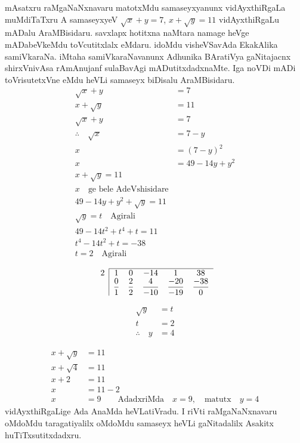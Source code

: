 mAsatxru raMgaNaNxnavaru matotxMdu samaseyxyanunx vidAyxthiRgaLa muMdiTaTxru
A samaseyxyeV \quad $\sqrt{x}+y=7$, \quad $x+\sqrt{y}=11$ \quad vidAyxthiRgaLu mADalu AraMBisidaru. savxlapx hotitxna naMtara namage heVge mADabeVkeMdu toVcutitxlalx eMdaru. idoMdu visheVSavAda EkakAlika samiVkaraNa. iMtaha samiVkaraNavanunx Adhunika BAratiVya gaNitajacnx shirxVnivAsa rAmAnujanf sulaBavAgi mADutitxdadxnaMte. Iga noVDi mADi toVrisutetxVne eMdu heVLi samaseyx biDisalu AraMBisidaru.
\begin{align*}
\sqrt{x}+y&=7 \tag{\rm 1}\\
x+\sqrt{y} &=11 \tag{\rm 2}\\
\sqrt{x}+y &=7 \tag{\rm 1}\\
\therefore \quad \sqrt{x} & =7-y\\
x&=(7-y)^2\\
x &=49-14y+y^2\\
x+\sqrt{y} =11 \tag{\rm 2}\\
x \quad \text{ge bele AdeVshisidare}\\
49-14y+y^2+\sqrt{y}=11\\
\sqrt{y}=t \quad \text{Agirali}\\
49-14t^2+t^4+t=11\\
t^4-14t^2+t=-38\\
t=2 \quad \text{Agirali}
\end{align*}

$$
\begin{array}{c|ccccc}
\cline{2-6}
2 &1 & 0 & -14 & 1  & 38\\
&\dfrac{0}{1}& \dfrac{2}{2} &\dfrac{4}{-10}& \dfrac{-20}{-19}&\dfrac{-38}{0}
\end{array}
$$

\begin{align*}
\sqrt{y} &=t\\
t&=2\\
\therefore \quad y&=4
\end{align*}

\begin{align*}
x+\sqrt{y} &=11\\
x+\sqrt{4} &=11\\
x+2 &=11\\
x &=11-2\\
x &=9 \qquad 
\text{AdadxriMda} \quad x=9, \quad \text{matutx} \quad y=4
\end{align*}
vidAyxthiRgaLige Ada AnaMda heVLatiVradu. I riVti raMgaNaNxnavaru oMdoMdu taragatiyalilx oMdoMdu samaseyx heVLi gaNitadalilx Asakitx huTiTxsutitxdadxru.

